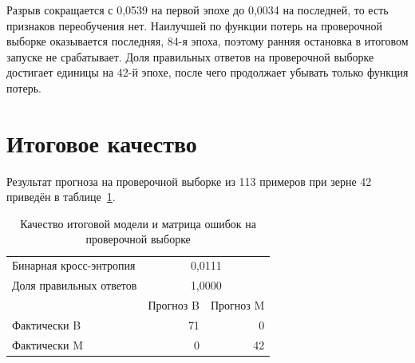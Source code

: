 Разрыв сокращается с 0,0539 на первой эпохе до 0,0034 на последней, то
есть признаков переобучения нет. Наилучшей по функции потерь на проверочной выборке
оказывается последняя, 84-я эпоха, поэтому ранняя остановка в итоговом запуске не
срабатывает. Доля правильных ответов на проверочной выборке достигает единицы на 42-й
эпохе, после чего продолжает убывать только функция потерь.

\section{Итоговое качество}

Результат прогноза на проверочной выборке из 113 примеров при зерне 42 приведён в
таблице~\ref{tab:final}.

\begin{table}[htbp]
\caption{Качество итоговой модели и матрица ошибок на проверочной выборке}
\label{tab:final}
\begin{center}
\begin{tabular}{|l|r|r|}
\hline
Бинарная кросс-энтропия & \multicolumn{2}{c|}{0,0111} \\
Доля правильных ответов & \multicolumn{2}{c|}{1,0000} \\
\hline
 & Прогноз B & Прогноз M \\
\hline
Фактически B & 71 & 0 \\
Фактически M & 0 & 42 \\
\hline
\end{tabular}
\end{center}
\end{table}


